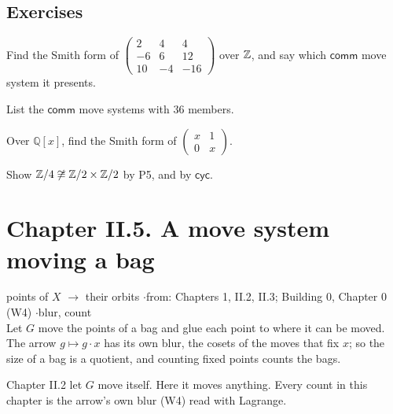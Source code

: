 \subsection*{Exercises}

\begin{lines}
\item[\lab{E1}] Find the Smith form of $\begin{pmatrix} 2 & 4 & 4 \\ -6 & 6 & 12 \\ 10 & -4 & -16 \end{pmatrix}$ over $\mathbb{Z}$, and say which $\mathsf{comm}$ move system it presents.
\item[\lab{E2}] List the $\mathsf{comm}$ move systems with $36$ members.
\item[\lab{E3}] Over $\mathbb{Q}[x]$, find the Smith form of $\begin{pmatrix} x & 1 \\ 0 & x \end{pmatrix}$.
\item[\lab{E4}] Show $\mathbb{Z}/4 \not\cong \mathbb{Z}/2 \times \mathbb{Z}/2$ by P5, and by $\mathsf{cyc}$.
\end{lines}

\newpage

\section*{Chapter II.5. A move system moving a bag}
\begin{center}
{\normalsize points of $X$ $\to$ their orbits \quad$\cdot$\quad from: Chapters 1, II.2, II.3; Building 0, Chapter 0 (W4) \quad$\cdot$\quad blur, count}\\[4pt]
{\small Let $G$ move the points of a bag and glue each point to where it can be moved. The arrow $g \mapsto g \cdot x$ has its own blur, the cosets of the moves that fix $x$; so the size of a bag is a quotient, and counting fixed points counts the bags.}
\end{center}

Chapter II.2 let $G$ move itself. Here it moves anything. Every count in this chapter is the arrow's own blur (W4) read with Lagrange.

